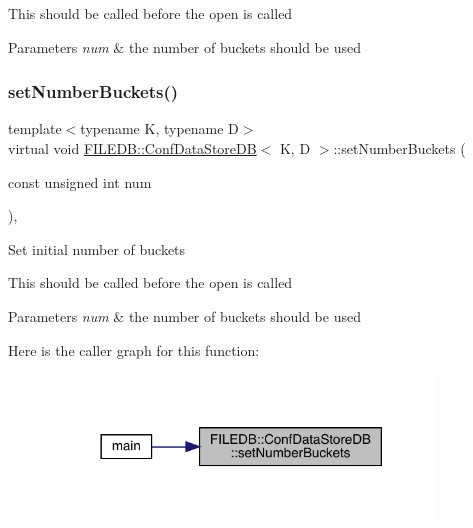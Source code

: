 This should be called before the open is called


\begin{DoxyParams}{Parameters}
{\em num} & the number of buckets should be used \\
\hline
\end{DoxyParams}
\mbox{\label{classFILEDB_1_1ConfDataStoreDB_a20a5d092cdcfbca4dbce15b2da006065}} 
\subsubsection{\texorpdfstring{setNumberBuckets()}{setNumberBuckets()}\hspace{0.1cm}{\footnotesize\ttfamily [2/3]}}
{\footnotesize\ttfamily template$<$typename K, typename D$>$ \\
virtual void \mbox{\hyperlink{classFILEDB_1_1ConfDataStoreDB}{F\+I\+L\+E\+D\+B\+::\+Conf\+Data\+Store\+DB}}$<$ K, D $>$\+::set\+Number\+Buckets (\begin{DoxyParamCaption}\item[{const unsigned int}]{num }\end{DoxyParamCaption})\hspace{0.3cm}{\ttfamily [inline]}, {\ttfamily [virtual]}}

Set initial number of buckets

This should be called before the open is called


\begin{DoxyParams}{Parameters}
{\em num} & the number of buckets should be used \\
\hline
\end{DoxyParams}
Here is the caller graph for this function\+:
\nopagebreak
\begin{figure}[H]
\begin{center}
\leavevmode
\includegraphics[width=290pt]{d8/d19/classFILEDB_1_1ConfDataStoreDB_a20a5d092cdcfbca4dbce15b2da006065_icgraph}
\end{center}
\end{figure}
\mbox{\label{classFILEDB_1_1ConfDataStoreDB_a20a5d092cdcfbca4dbce15b2da006065}} 
